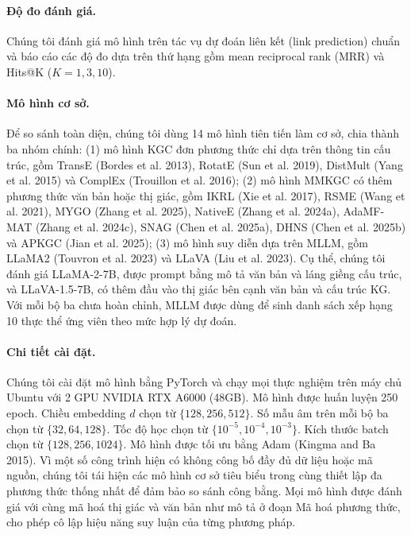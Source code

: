 \documentclass[10pt,twocolumn,a4paper]{article}
\begin{document}
\paragraph{Độ đo đánh giá.}
Chúng tôi đánh giá mô hình trên tác vụ dự đoán liên kết (link prediction) chuẩn và báo cáo các độ đo dựa trên thứ hạng gồm mean reciprocal rank (MRR) và Hits@K ($K = 1, 3, 10$).

\paragraph{Mô hình cơ sở.}
Để so sánh toàn diện, chúng tôi dùng 14 mô hình tiên tiến làm cơ sở, chia thành ba nhóm chính: (1) mô hình KGC đơn phương thức chỉ dựa trên thông tin cấu trúc, gồm TransE (Bordes et al. 2013), RotatE (Sun et al. 2019), DistMult (Yang et al. 2015) và ComplEx (Trouillon et al. 2016); (2) mô hình MMKGC có thêm phương thức văn bản hoặc thị giác, gồm IKRL (Xie et al. 2017), RSME (Wang et al. 2021), MYGO (Zhang et al. 2025), NativeE (Zhang et al. 2024a), AdaMF-MAT (Zhang et al. 2024c), SNAG (Chen et al. 2025a), DHNS (Chen et al. 2025b) và APKGC (Jian et al. 2025); (3) mô hình suy diễn dựa trên MLLM, gồm LLaMA2 (Touvron et al. 2023) và LLaVA (Liu et al. 2023). Cụ thể, chúng tôi đánh giá LLaMA-2-7B, được prompt bằng mô tả văn bản và láng giềng cấu trúc, và LLaVA-1.5-7B, có thêm đầu vào thị giác bên cạnh văn bản và cấu trúc KG. Với mỗi bộ ba chưa hoàn chỉnh, MLLM được dùng để sinh danh sách xếp hạng 10 thực thể ứng viên theo mức hợp lý dự đoán.

\paragraph{Chi tiết cài đặt.}
Chúng tôi cài đặt mô hình bằng PyTorch và chạy mọi thực nghiệm trên máy chủ Ubuntu với 2 GPU NVIDIA RTX A6000 (48GB). Mô hình được huấn luyện 250 epoch. Chiều embedding $d$ chọn từ $\{128, 256, 512\}$. Số mẫu âm trên mỗi bộ ba chọn từ $\{32, 64, 128\}$. Tốc độ học chọn từ $\{10^{-5}, 10^{-4}, 10^{-3}\}$. Kích thước batch chọn từ $\{128, 256, 1024\}$. Mô hình được tối ưu bằng Adam (Kingma and Ba 2015). Vì một số công trình hiện có không công bố đầy đủ dữ liệu hoặc mã nguồn, chúng tôi tái hiện các mô hình cơ sở tiêu biểu trong cùng thiết lập đa phương thức thống nhất để đảm bảo so sánh công bằng. Mọi mô hình được đánh giá với cùng mã hoá thị giác và văn bản như mô tả ở đoạn Mã hoá phương thức, cho phép cô lập hiệu năng suy luận của từng phương pháp.
\end{document}
